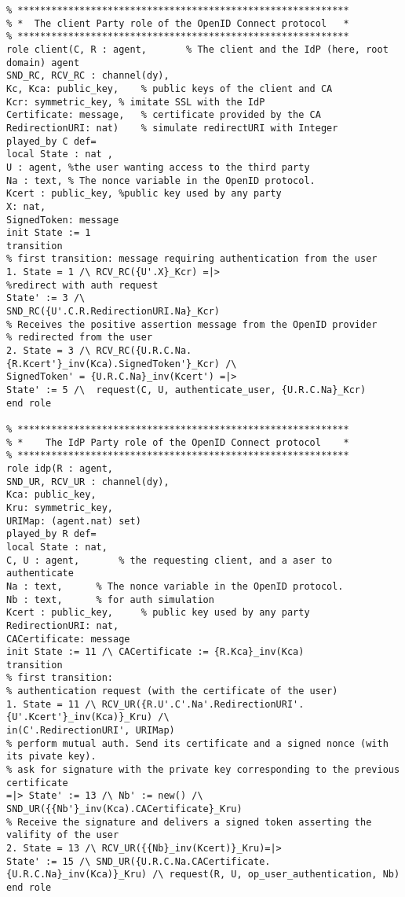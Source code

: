 \begin{lstlisting}
% ***********************************************************
% *  The client Party role of the OpenID Connect protocol   *
% ***********************************************************	
role client(C, R : agent, 		% The client and the IdP (here, root domain) agent
SND_RC, RCV_RC : channel(dy),
Kc, Kca: public_key, 	% public keys of the client and CA
Kcr: symmetric_key,	% imitate SSL with the IdP
Certificate: message,	% certificate provided by the CA
RedirectionURI: nat)	% simulate redirectURI with Integer
played_by C	def=
local State : nat ,
U : agent, %the user wanting access to the third party
Na : text, % The nonce variable in the OpenID protocol.
Kcert : public_key, %public key used by any party
X: nat,
SignedToken: message
init State := 1
transition
% first transition: message requiring authentication from the user
1. State = 1 /\ RCV_RC({U'.X}_Kcr) =|>
%redirect with auth request
State' := 3 /\ 
SND_RC({U'.C.R.RedirectionURI.Na}_Kcr)
% Receives the positive assertion message from the OpenID provider 
% redirected from the user
2. State = 3 /\ RCV_RC({U.R.C.Na.{R.Kcert'}_inv(Kca).SignedToken'}_Kcr) /\
SignedToken' = {U.R.C.Na}_inv(Kcert') =|>
State' := 5 /\	request(C, U, authenticate_user, {U.R.C.Na}_Kcr)
end role

% ***********************************************************
% *    The IdP Party role of the OpenID Connect protocol    *
% ***********************************************************	
role idp(R : agent, 
SND_UR, RCV_UR : channel(dy),
Kca: public_key,
Kru: symmetric_key,
URIMap: (agent.nat) set)
played_by R	def=
local State : nat,
C, U : agent, 		% the requesting client, and a aser to authenticate
Na : text, 		% The nonce variable in the OpenID protocol.
Nb : text, 		% for auth simulation
Kcert : public_key, 	% public key used by any party
RedirectionURI: nat,	
CACertificate: message
init State := 11 /\ CACertificate := {R.Kca}_inv(Kca)
transition
% first transition:
% authentication request (with the certificate of the user)
1. State = 11 /\ RCV_UR({R.U'.C'.Na'.RedirectionURI'.{U'.Kcert'}_inv(Kca)}_Kru) /\ 
in(C'.RedirectionURI', URIMap)
% perform mutual auth. Send its certificate and a signed nonce (with its pivate key).
% ask for signature with the private key corresponding to the previous certificate
=|> State' := 13 /\ Nb' := new() /\ SND_UR({{Nb'}_inv(Kca).CACertificate}_Kru)
% Receive the signature and delivers a signed token asserting the valifity of the user
2. State = 13 /\ RCV_UR({{Nb}_inv(Kcert)}_Kru)=|>
State' := 15 /\ SND_UR({U.R.C.Na.CACertificate.{U.R.C.Na}_inv(Kca)}_Kru) /\ request(R, U, op_user_authentication, Nb) 
end role


\end{lstlisting}
